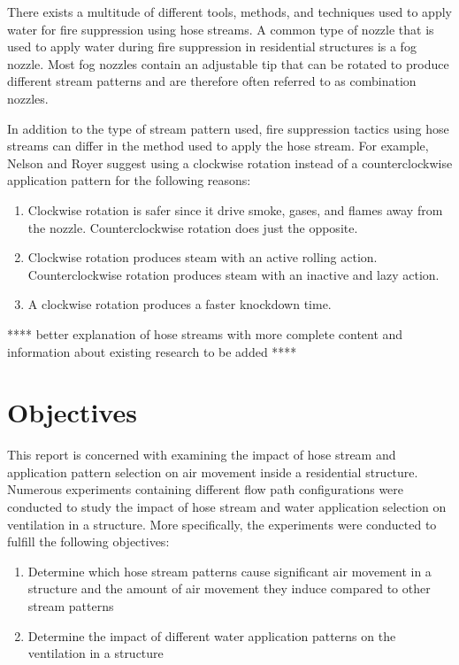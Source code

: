 \documentclass[12pt,oneside]{book}
\begin{document}
There exists a multitude of different tools, methods, and techniques used to apply water for fire suppression using hose streams. A common type of nozzle that is used to apply water during fire suppression in residential structures is a fog nozzle. Most fog nozzles contain an adjustable tip that can be rotated to produce different stream patterns and are therefore often referred to as combination nozzles. 

In addition to the type of stream pattern used, fire suppression tactics using hose streams can differ in the method used to apply the hose stream. For example, Nelson and Royer suggest using a clockwise rotation instead of a counterclockwise application pattern for the following reasons:
\begin{enumerate} 
\item Clockwise rotation is safer since it drive smoke, gases, and flames away from the nozzle.
Counterclockwise rotation does just the opposite.
\item Clockwise rotation produces steam with an active rolling action. Counterclockwise rotation
produces steam with an inactive and lazy action.
\item A clockwise rotation produces a faster knockdown time.
\end{enumerate}

**** better explanation of hose streams with more complete content and information about existing research to be added **** 

\section{Objectives}
\label{sec:objectives}
This report is concerned with examining the impact of hose stream and application pattern selection on air movement inside a residential structure. Numerous experiments containing different flow path configurations were conducted to study the impact of hose stream and water application selection on ventilation in a structure. More specifically, the experiments were conducted to fulfill the following objectives:
\begin{enumerate}
\item Determine which hose stream patterns cause significant air movement in a structure and the amount of air movement they induce compared to other stream patterns
\item Determine the impact of different water application patterns on the ventilation in a structure
\end{enumerate}
\end{document}
